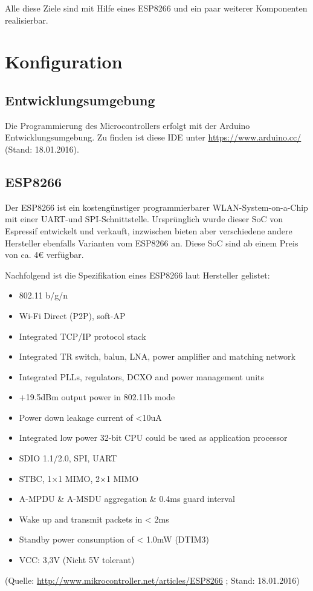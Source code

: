 Alle diese Ziele sind mit Hilfe eines ESP8266 und ein paar weiterer Komponenten realisierbar.

\section{Konfiguration}
\subsection{Entwicklungsumgebung}
Die Programmierung des Microcontrollers erfolgt mit der Arduino Entwicklungsumgebung.
Zu finden ist diese IDE unter \url{https://www.arduino.cc/} (Stand: 18.01.2016).

\subsection{ESP8266}
Der ESP8266 ist ein kostengünstiger programmierbarer WLAN-System-on-a-Chip mit einer UART-und SPI-Schnittstelle.
Ursprünglich wurde dieser SoC von Espressif entwickelt und verkauft, inzwischen bieten aber verschiedene andere Hersteller ebenfalls Varianten vom ESP8266 an.
Diese SoC sind ab einem Preis von ca. 4€ verfügbar.

Nachfolgend ist die Spezifikation eines ESP8266 laut Hersteller gelistet:

\begin{itemize}
	\item 802.11 b/g/n
    \item Wi-Fi Direct (P2P), soft-AP
    \item Integrated TCP/IP protocol stack
    \item Integrated TR switch, balun, LNA, power amplifier and matching network
    \item Integrated PLLs, regulators, DCXO and power management units
    \item +19.5dBm output power in 802.11b mode
    \item Power down leakage current of <10uA
    \item Integrated low power 32-bit CPU could be used as application processor
    \item SDIO 1.1/2.0, SPI, UART
    \item STBC, 1×1 MIMO, 2×1 MIMO
    \item A-MPDU \& A-MSDU aggregation \& 0.4ms guard interval
    \item Wake up and transmit packets in < 2ms
    \item Standby power consumption of < 1.0mW (DTIM3)
    \item VCC: 3,3V (Nicht 5V tolerant)
\end{itemize}
(Quelle: \url{http://www.mikrocontroller.net/articles/ESP8266} ; Stand: 18.01.2016)


